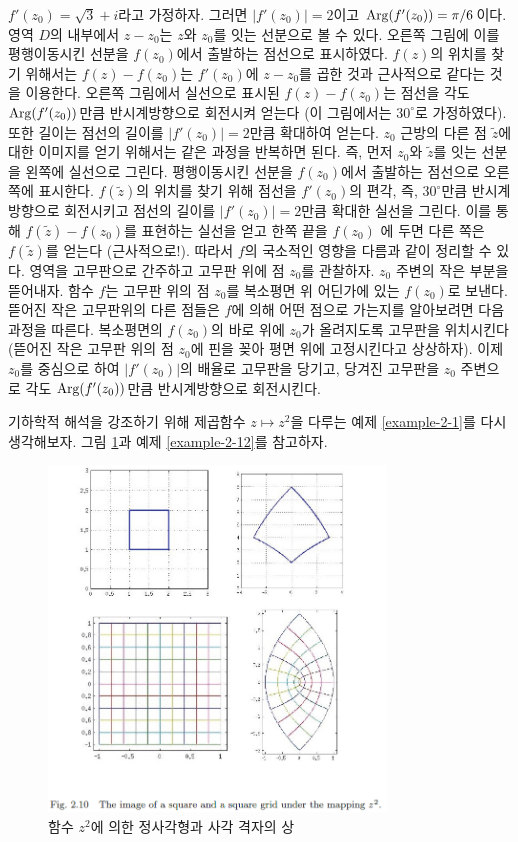 $f'(z_0) = \sqrt{3} +i$라고 가정하자.
그러면 $|f'(z_0)| = 2$이고 $\mathop{\mathrm{Arg}}(f'(z_0))=\pi/6$이다.
영역 $D$의 내부에서 $z-z_0$는 $z$와 $z_0$를 잇는 선분으로 볼 수 있다.
오른쪽 그림에 이를 평행이동시킨 선분을 $f(z_0)$에서 출발하는 점선으로 표시하였다.
$f(z)$의 위치를 찾기 위해서는
$f(z)-f(z_0)$는 $f'(z_0)$에 $z-z_0$를 곱한 것과 근사적으로 같다는 것을 이용한다.
오른쪽 그림에서 실선으로 표시된 $f(z)-f(z_0)$는
점선을 각도 $\mathop{\mathrm{Arg}}(f'(z_0))$만큼 반시계방향으로 회전시켜 얻는다
(이 그림에서는 $30^\circ$로 가정하였다).
또한 길이는 점선의 길이를 $|f'(z_0)|=2$만큼 확대하여 얻는다.
$z_0$ 근방의 다른 점 $\tilde z$에 대한 이미지를 얻기 위해서는 
같은 과정을 반복하면 된다.
즉, 먼저 $z_0$와  $\tilde z$를 잇는 선분을 왼쪽에 실선으로 그린다.
평행이동시킨 선분을 $f(z_0)$에서 출발하는 점선으로 오른쪽에 표시한다.
$f(\tilde z)$의 위치를 찾기 위해
점선을 $f'(z_0)$의 편각, 즉, $30^\circ$만큼 반시계방향으로 회전시키고
점선의 길이를 $|f'(z_0)|=2$만큼 확대한 실선을 그린다.
이를 통해 $f(\tilde z) - f(z_0)$를 표현하는 실선을 얻고
한쪽 끝을 $f(z_0)$ 에 두면 다른 쪽은 $f(\tilde z)$를 얻는다 (근사적으로!).
따라서 $f$의 국소적인 영향을 다름과 같이 정리할 수 있다.
영역을 고무판으로 간주하고 고무판 위에 점 $z_0$를 관찰하자.
$z_0$ 주변의 작은 부분을 뜯어내자.
함수 $f$는 고무판 위의 점 $z_0$를 복소평면 위 어딘가에 있는 $f(z_0)$로 보낸다.
뜯어진 작은 고무판위의 다른 점들은 $f$에 의해 어떤 점으로 가는지를
알아보려면 다음 과정을 따른다.
복소평면의 $f(z_0)$의 바로 위에 $z_0$가 올려지도록 고무판을 위치시킨다
(뜯어진 작은 고무판 위의 점 $z_0$에 핀을 꽂아 평면 위에 고정시킨다고 상상하자).
이제 $z_0$를 중심으로 하여 $|f'(z_0)|$의 배율로 고무판을 당기고,
당겨진 고무판을 $z_0$ 주변으로 각도 $\mathop{\mathrm{Arg}}(f'(z_0))$만큼 반시계방향으로 회전시킨다.

기하학적 해석을 강조하기 위해
제곱함수 $z\mapsto z^2$을 다루는
예제 \ref{example-2-1}를 다시 생각해보자.
그림 \ref{fig-2-10}과 예제 \ref{example-2-12}를 참고하자.

\begin{figure}[!h]
\begin{center}
\includegraphics[width=0.8\textwidth]{./SaltChapter/fig-2-10}
\end{center}
\caption{함수 $z^2$에 의한 정사각형과 사각 격자의 상}
\label{fig-2-10}
\end{figure}

